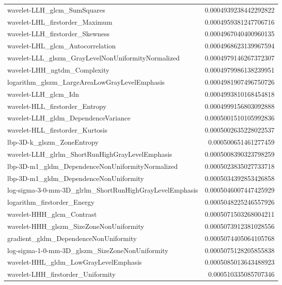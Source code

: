 {\begin{xltabular}[H]{\textwidth}{X r}
        wavelet-LLH\_glcm\_SumSquares & 0.0004939238442292822 \\
        wavelet-LHL\_firstorder\_Maximum & 0.0004959381247706716 \\
        wavelet-LLH\_firstorder\_Skewness & 0.0004967040400960135 \\
        wavelet-LHL\_glcm\_Autocorrelation & 0.0004968623139967594 \\
        wavelet-LLL\_glszm\_GrayLevelNonUniformityNormalized & 0.0004979146267372307 \\
        wavelet-LHH\_ngtdm\_Complexity & 0.0004979986138239951 \\
        logarithm\_glszm\_LargeAreaLowGrayLevelEmphasis & 0.0004981907496750726 \\
        wavelet-LLH\_glcm\_Idn & 0.0004993810168454818 \\
        wavelet-HLL\_firstorder\_Entropy & 0.0004999156803092888 \\
        wavelet-LLH\_gldm\_DependenceVariance & 0.0005001510105992836 \\
        wavelet-HLL\_firstorder\_Kurtosis & 0.0005002635228022537 \\
        lbp-3D-k\_glszm\_ZoneEntropy & 0.000500651461277459 \\
        wavelet-LLH\_glrlm\_ShortRunHighGrayLevelEmphasis & 0.0005008390323798259 \\
        lbp-3D-m1\_gldm\_DependenceNonUniformityNormalized & 0.0005023835027733718 \\
        lbp-3D-m1\_gldm\_DependenceNonUniformity & 0.0005034392853426858 \\
        log-sigma-3-0-mm-3D\_glrlm\_ShortRunHighGrayLevelEmphasis & 0.0005046007447425929 \\
        logarithm\_firstorder\_Energy & 0.0005048225246557926 \\
        wavelet-HHH\_glcm\_Contrast & 0.0005071503268004211 \\
        wavelet-HHH\_glszm\_SizeZoneNonUniformity & 0.0005073912381028556 \\
        gradient\_gldm\_DependenceNonUniformity & 0.0005074405064105768 \\
        log-sigma-1-0-mm-3D\_glszm\_SizeZoneNonUniformity & 0.0005075128205855838 \\
        wavelet-HHL\_gldm\_LowGrayLevelEmphasis & 0.0005085013643488923 \\
        wavelet-LHH\_firstorder\_Uniformity & 0.000510335085707346 \\

\end{xltabular}}
